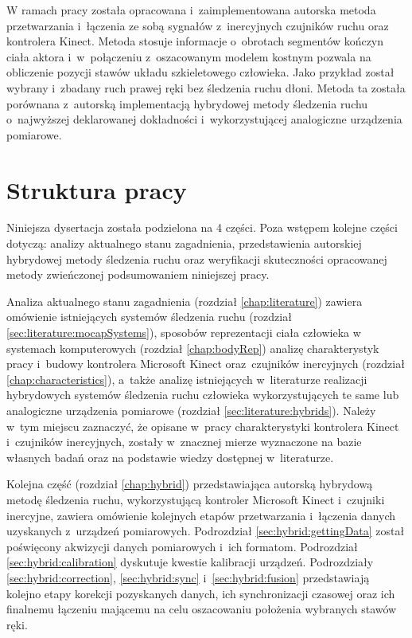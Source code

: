 W ramach pracy została opracowana i~zaimplementowana autorska metoda przetwarzania i~łączenia ze sobą sygnałów z~inercyjnych czujników ruchu oraz kontrolera Kinect. Metoda stosuje informacje o~obrotach segmentów kończyn ciała aktora i~w~połączeniu z~oszacowanym modelem kostnym pozwala na obliczenie pozycji stawów układu szkieletowego człowieka. 
Jako przykład został wybrany i~zbadany ruch prawej ręki bez śledzenia ruchu dłoni. Metoda ta została porównana z~autorską implementacją hybrydowej metody śledzenia ruchu o~najwyższej deklarowanej dokładności i~wykorzystującej analogiczne urządzenia pomiarowe.\\

\section{Struktura pracy}
Niniejsza dysertacja została podzielona na 4 części. Poza wstępem kolejne części dotyczą: analizy aktualnego stanu zagadnienia, przedstawienia autorskiej hybrydowej metody śledzenia ruchu oraz weryfikacji skuteczności opracowanej metody zwieńczonej podsumowaniem niniejszej pracy. 

Analiza aktualnego stanu zagadnienia (rozdział \ref{chap:literature}) zawiera omówienie istniejących systemów śledzenia ruchu (rozdział \ref{sec:literature:mocapSystems}), sposobów reprezentacji ciała człowieka w systemach komputerowych (rozdział \ref{chap:bodyRep}) analizę charakterystyk pracy i~budowy kontrolera Microsoft Kinect oraz~czujników inercyjnych (rozdział \ref{chap:characteristics}), a~także analizę istniejących w~literaturze realizacji hybrydowych systemów śledzenia ruchu człowieka wykorzystujących te same lub analogiczne urządzenia pomiarowe (rozdział \ref{sec:literature:hybrids}). Należy w~tym miejscu zaznaczyć, że opisane w~pracy charakterystyki kontrolera Kinect i~czujników inercyjnych, zostały w~znacznej mierze wyznaczone na bazie własnych badań oraz na podstawie wiedzy dostępnej w~literaturze.

Kolejna część (rozdział \ref{chap:hybrid}) przedstawiająca autorską hybrydową metodę śledzenia ruchu, wykorzystującą kontroler Microsoft Kinect i~czujniki inercyjne, zawiera omówienie kolejnych etapów przetwarzania i~łączenia danych uzyskanych z~urządzeń pomiarowych. Podrozdział \ref{sec:hybrid:gettingData} został poświęcony akwizycji danych pomiarowych i~ich formatom. Podrozdział \ref{sec:hybrid:calibration} dyskutuje kwestie kalibracji urządzeń. Podrozdziały \ref{sec:hybrid:correction}, \ref{sec:hybrid:sync} i~\ref{sec:hybrid:fusion} przedstawiają kolejno etapy korekcji pozyskanych danych, ich synchronizacji czasowej oraz ich finalnemu łączeniu mającemu na celu oszacowaniu położenia wybranych stawów ręki. 

